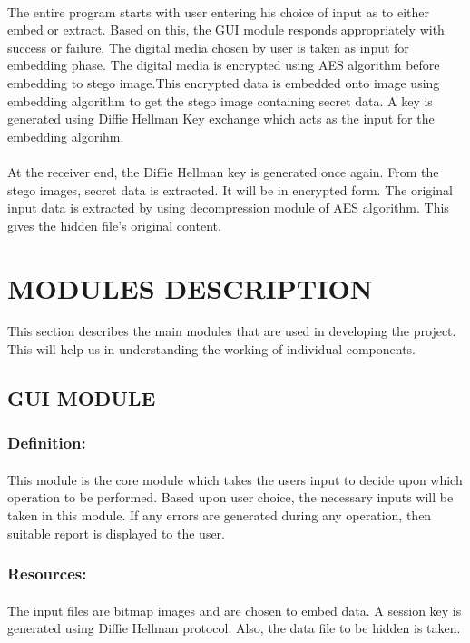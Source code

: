 \documentclass[12pt]{report}
\begin{document}
\paragraph{} The entire program starts with user entering his choice of input as to either embed or extract. Based on this, the GUI module responds appropriately with success or failure. The digital media chosen by user is taken as input for embedding phase. The digital media is encrypted using AES algorithm before embedding to stego image.This encrypted data is embedded onto image using embedding algorithm to get the stego image containing secret data. A key is generated using Diffie Hellman Key exchange which acts as the input for the embedding algorihm.
\paragraph{} At the receiver end, the Diffie Hellman key is generated once again. From the stego images, secret data is extracted. It will be in encrypted form. The original input data is extracted by using decompression module of AES algorithm. This gives the hidden file's original content.

\pagebreak
\section{MODULES DESCRIPTION}
This section describes the main modules that are used in developing the project. This will help us in understanding the working of individual components. 
\subsection{GUI MODULE}
\subsubsection{Definition:} 
\paragraph{} This module is the core module which takes the users input to decide upon which operation to be performed. Based upon user choice, the necessary inputs will be taken in this module. If any errors are generated during any operation, then suitable report is displayed to the user.
\subsubsection{Resources:} 
\paragraph{}The input files are bitmap images and are chosen to embed data. A session key is generated using Diffie Hellman protocol. Also, the data file to be hidden is taken.
\end{document}
